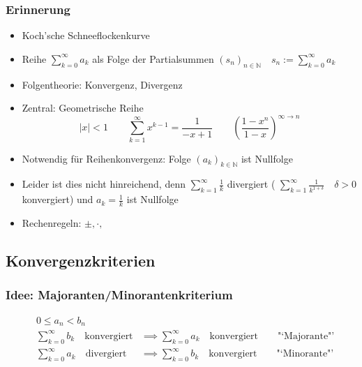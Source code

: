 

\subsubsection*{Erinnerung}
\begin{itemize}
	\item Koch'sche Schneeflockenkurve
	\item Reihe \( \sum_{k=0}^{\infty} a_k \) als Folge der Partialsummen \( (s_n)_{n \in \mathbb{N} } \quad s_n := \sum_{k=0}^{\infty}a_k \)
	\item Folgentheorie: Konvergenz, Divergenz
	\item Zentral: Geometrische Reihe \[
		|x|<1 \qquad \sum_{k=1}^{\infty} x^{k-1} = \frac{1}{-x+1} \qquad \left(\frac{1-x^n}{1-x}\right)^{\infty\rightarrow n}
	\]
	\item Notwendig für Reihenkonvergenz: Folge \( (a_k)_{k \in \mathbb{N}} \) ist Nullfolge
	\item Leider ist dies nicht hinreichend, denn \( \sum_{k=1}^{\infty} \frac{1}{k} \) divergiert ( \(\sum_{k=1}^{\infty}\frac{1}{k^{1+\delta}} \quad   \delta > 0 \) konvergiert) und \( a_k = \frac{1}{k} \) ist Nullfolge
	\item Rechenregeln: \( \pm, \cdot, \) 
\end{itemize}

\subsection*{Konvergenzkriterien}
\subsubsection*{Idee: Majoranten/Minorantenkriterium}
	
\begin{align*}
	& 0 \leq a_n < b_n & \\
	& \sum_{k=0}^{\infty}b_k \quad\text{konvergiert} &\implies \sum_{k=0}^{\infty} a_k \quad\text{konvergiert} \qquad \text{"`Majorante"'} \\
	& \sum_{k=0}^{\infty}a_k \quad\text{divergiert} &\implies \sum_{k=0}^{\infty} b_k \quad\text{konvergiert} \qquad \text{"`Minorante"'}
\end{align*}

